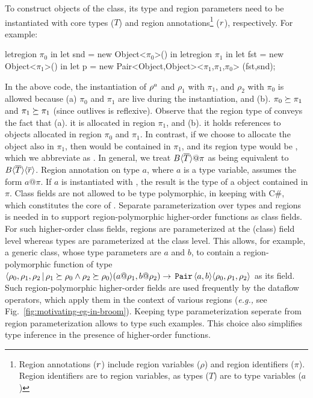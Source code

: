 To construct objects of the  class, its type and region
parameters need to be instantiated with core types ($T$) and region
annotations\footnote{Region annotations ($r$) include region
variables ($\rho$) and region identifiers ($\pi$). Region identifiers
are to region variables, as types ($T$) are to type variables ($a$)}
($r$), respectively. For example:
\begin{codejava}
letregion $\pi_0$ in
  let snd = new Object<$\pi_0$>() in
  letregion $\pi_1$ in
    let fst = new Object<$\pi_1$>() in
    let p = new Pair<Object,Object><$\pi_1$,$\pi_1$,$\pi_0$> (fst,snd);
\end{codejava}
In the above code, the instantiation of $\rho^a$ and $\rho_1$ with
$\pi_1$, and $\rho_2$ with $\pi_0$ is allowed because (a) $\pi_0$
and $\pi_1$ are live during the instantiation, and (b). $\pi_0
\succeq \pi_1$ and $\pi_1 \succeq \pi_1$ (since outlives is
reflexive). Observe that the region type of  conveys
the fact that (a). it is allocated in region $\pi_1$, and (b). it
holds references to objects allocated in region $\pi_0$ and $\pi_1$.
In contrast, if we choose to allocate the  object also in
$\pi_1$, then  would be contained in $\pi_1$, and its region
type would be , which
we abbreviate as . In general, we treat
$B\inang{\tbar}@\pi$ as being equivalent to
$B\langle \overline{T} \rangle\langle \overline{r} \rangle$. Region annotation on type $a$, where
$a$ is a type variable, assumes the form $a@\pi$. If $a$ is
instantiated with , the result is the type of a
 object contained in  $\pi$. Class fields are not allowed to
be type polymorphic, in keeping with C\#, which constitutes the core
of \name. Separate parameterization over types and regions is needed
in \FB to support region-polymorphic higher-order functions as class
fields. For such higher-order class fields, regions are parameterized
at the (class) field level whereas types are parameterized at the
class level. This allows, for example, a generic class, whose type
parameters are $a$ and $b$, to contain a region-polymorphic function of type
$\langle \rho_0,\rho_1,\rho_2 \,|\, \rho_1 \succeq \rho_0 \wedge
\rho_2 \succeq \rho_0 \rangle(a@\rho_1,b@\rho_2) \rightarrow
\,{\tt Pair}\,\langle a,b \rangle\langle \rho_0,\rho_1,\rho_2 \rangle$ as its field. Such
region-polymorphic higher-order fields are used frequently by the
dataflow operators, which apply them in the context of various regions
(\emph{e.g.,} see Fig.~\ref{fig:motivating-eg-in-broom}). Keeping type
parameterization seperate from region parameterization allows \FB to
type such examples. This choice also simplifies type inference in the
presence of higher-order functions.


